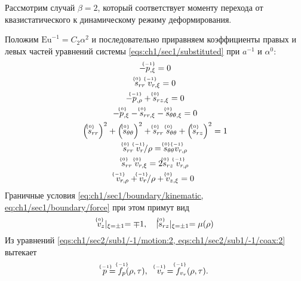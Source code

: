 Рассмотрим случай $\beta=2$, который соответствует моменту перехода от квазистатического к динамическому режиму деформирования.

Положим $\text{Eu}^{-1} = C_2 \alpha^2$ и последовательно приравняем коэффициенты правых и левых частей уравнений системы \cref{eqs:ch1/sec1/substituted} при $a^{-1}$ и $\alpha^0$:
\begin{subequations}
  \label{eqs:ch1/sec2/sub1/main}
  \begin{gather}
    \label{eqs:ch1/sec2/sub1/-1/motion:2}
    -\uindex{p}{-1}_{,\xi} = 0
    \\
    \label{eqs:ch1/sec2/sub1/-1/coax:2}
    \uindex{s}{0}_{rr} \; \uindex{v}{-1}_{r,\xi} = 0
    \\
    \label{eqs:ch1/sec2/sub1/0/motion:1}
    -\uindex{p}{-1}_{,\rho}+\uindex{s}{0}_{rz,\xi} = 0
    \\
    \label{eqs:ch1/sec2/sub1/0/motion:2}
    -\uindex{p}{0}_{,\xi} - \uindex{s}{0}_{rr,\xi} - \uindex{s}{0}_{\theta\theta,\xi} = 0
    \\
    \label{eqs:ch1/sec2/sub1/0/plasticity}
    \left(\uindex{s}{0}_{rr}\right)^2 + \left(\uindex{s}{0}_{\theta\theta}\right)^2 + \uindex{s}{0}_{rr}\; \uindex{s}{0}_{\theta\theta} + \left(\uindex{s}{0}_{rz}\right)^2 = 1
    \\
    \label{eqs:ch1/sec2/sub1/0/coax:1}
    \uindex{s}{0}_{rr} \; \uindex{v}{-1}_{r} / \rho = \uindex{s}{0}_{\theta\theta} \uindex{v}{-1}_{r,\rho}
    \\
    \label{eqs:ch1/sec2/sub1/0/coax:2}
    \uindex{s}{0}_{rr} \; \uindex{v}{0}_{r,\xi} = 2 \uindex{s}{0}_{rz} \; \uindex{v}{-1}_{r,\rho}
    \\
    \label{eqs:ch1/sec2/sub1/0/uncompress}
    \uindex{v}{-1}_{r,\rho} + \uindex{v}{-1}_{r} / \rho + \uindex{v}{0}_{z,\xi} = 0
  \end{gather}
\end{subequations}
Граничные условия \cref{eq:ch1/sec1/boundary/kinematic, eq:ch1/sec1/boundary/force} при этом примут вид
\begin{equation}
  \label{eq:ch1/sec1/sub1/boundary/0}
  \uindex{v}{0}_{z}\lvert_{\xi=\pm 1} = \mp 1, \quad \lvert \uindex{s}{0}_{rz}\lvert_{\xi=\pm 1} = \mu(\rho)
\end{equation}
Из уравнений \cref{eqs:ch1/sec2/sub1/-1/motion:2, eqs:ch1/sec2/sub1/-1/coax:2} вытекает
\begin{equation*}
  \uindex{p}{-1} = \uindex{f}{-1}_{p}(\rho, \tau), \quad \uindex{v}{-1}_{r} = \uindex{f}{-1}_{v_{r}}(\rho, \tau).
\end{equation*}
